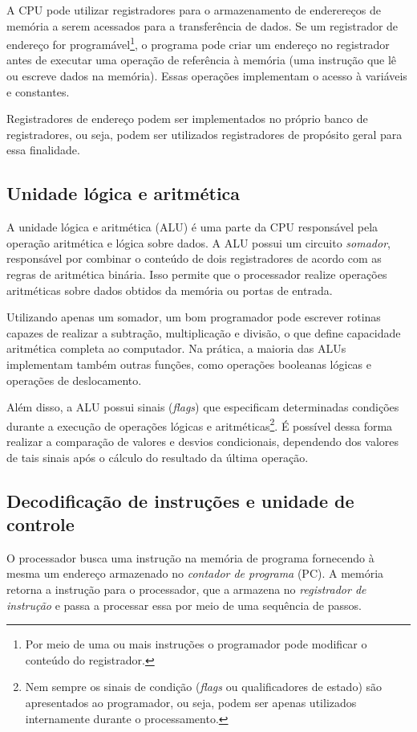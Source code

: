 \documentclass[11pt,a4paper]{report}
\begin{document}
A CPU pode utilizar registradores para o armazenamento de enderereços
de memória a serem acessados para a transferência de dados. Se um
registrador de endereço for programável\footnote{Por meio de uma ou
mais instruções o programador pode modificar o conteúdo do registrador.},
o programa pode criar um endereço no registrador antes de executar uma
operação de referência à memória (uma instrução que lê ou escreve dados
na memória). Essas operações implementam o acesso à variáveis e constantes.

Registradores de endereço podem ser implementados no próprio banco de
registradores, ou seja, podem ser utilizados registradores de propósito
geral para essa finalidade.

\subsection{Unidade lógica e aritmética}

A unidade lógica e aritmética (ALU) é uma parte da CPU responsável pela
operação aritmética e lógica sobre dados. A ALU possui um circuito
\textit{somador}, responsável por combinar o conteúdo de dois registradores
de acordo com as regras de aritmética binária. Isso permite que o
processador realize operações aritméticas sobre dados obtidos da memória
ou portas de entrada.

Utilizando apenas um somador, um bom programador pode escrever rotinas
capazes de realizar a subtração, multiplicação e divisão, o que define
capacidade aritmética completa ao computador. Na prática, a maioria das
ALUs implementam também outras funções, como operações booleanas lógicas
e operações de deslocamento.

Além disso, a ALU possui sinais (\textit{flags}) que especificam
determinadas condições durante a execução de operações lógicas e
aritméticas\footnote{Nem sempre os sinais de condição (\textit{flags} ou
qualificadores de estado) são apresentados ao programador, ou seja, podem 
ser apenas utilizados internamente durante o processamento.}. É possível
dessa forma realizar a comparação de valores e desvios condicionais,
dependendo dos valores de tais sinais após o cálculo do resultado da
última operação.

\subsection{Decodificação de instruções e unidade de controle}

O processador busca uma instrução na memória de programa fornecendo à
mesma um endereço armazenado no \textit{contador de programa} (PC).
A memória retorna a instrução para o processador, que a armazena no
\textit{registrador de instrução} e passa a processar essa por meio
de uma sequência de passos.
\end{document}
